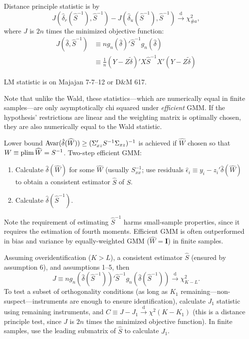 \documentclass[8pt,letterpaper, landscape]{extarticle} %
\newcommand{\mI}{\ensuremath{\mathbf{I}}}
\begin{document}
\begin{multicols}{3}
\begin{description}
Distance principle statistic is by
$$ J(\hat{\delta}_r (\widehat{S}^{-1}), \widehat{S}^{-1}) - J(\hat{\delta}_u (\widehat{S}^{-1}), \widehat{S}^{-1}) \xrightarrow{\text{d}} \chi^{2}_{\# a} , $$
where $ J $ is $ 2n $ times the minimized objective function:
\begin{align*}
J(\hat{\delta}, \widehat{S}^{-1})  &\equiv n g_n (\hat{\delta})' \widehat{S}^{-1} g_n (\hat{\delta}) \\
&\equiv \tfrac{1}{n} (Y - Z \tilde{\delta})' X \widehat{S}^{-1} X' (Y - Z \tilde{\delta})
\end{align*}

LM statistic is on Majajan 7-7--12 or D\&M 617.

Note that unlike the Wald, these statistics---which are numerically equal in finite samples---are only asymptotically chi squared under \textit{efficient} GMM. If the hypothesis' restrictions are linear and the weighting matrix is optimally chosen, they are also numerically equal to the Wald statistic.

 Lower bound $ \operatorname{Avar} (\hat{\delta}(\widehat{W})) \geq (\Sigma_{xz}' S^{-1} \Sigma_{xz})^{-1} $ is achieved if $ \widehat{W} $ chosen so that $ W \equiv \operatorname*{plim} \widehat{W} = S^{-1} $. Two-step efficient GMM:
\begin{enumerate}
\item Calculate $ \hat{\delta} (\widehat{W}) $ for some  $ \widehat{W} $ (usually $ S_{xx}^{-1} $; use residuals $ \hat{\epsilon}_{i} \equiv y_i - z_{i}' \hat{\delta} (\widehat{W}) $ to obtain a consistent estimator $ \widehat{S} $ of $ S $.
\item Calculate $ \hat{\delta} (\widehat{S}^{-1}) $.
\end{enumerate}
Note the requirement of estimating $ \widehat{S}^{-1} $ harms small-sample properties, since it requires the estimation of fourth moments. Efficient GMM is often outperformed in bias and variance by equally-weighted GMM ($ \widehat{W} = \mI $) in finite samples.

 Assuming overidentification ($ K > L $), a consistent estimator $ \widehat{S} $ (ensured by assumption 6), and assumptions 1--5, then
$$ J \equiv n g_n (\hat{\delta} (\widehat{S}^{-1}))' \widehat{S}^{-1} g_n (\hat{\delta} (\widehat{S}^{-1})) \xrightarrow{\text{d}} \chi^2_{K-L}. $$
To test a subset of orthogonality conditions (as long as $ K_1 $ remaining---non-suspect---instruments are enough to ensure identification), calculate $ J_1 $ statistic using remaining instruments, and $ C \equiv J - J_1 \xrightarrow{\text{d}} \chi^2 (K - K_1) $ (this is a distance principle test, since $ J $ is $ 2n $ times the minimized objective function). In finite samples, use the leading submatrix of $ \widehat{S} $ to calculate $ J_1 $.


\end{description}
\end{multicols}
\end{document}
